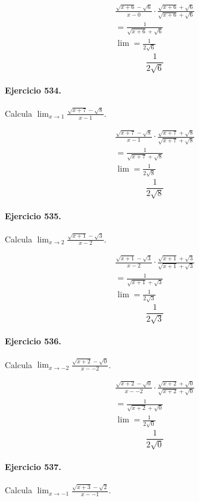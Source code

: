 \documentclass[11pt,a4paper]{article}
\begin{document}
\[
\begin{aligned}
\frac{\sqrt{x+6}-\sqrt{6}}{x-0}\cdot \frac{\sqrt{x+6}+\sqrt{6}}{\sqrt{x+6}+\sqrt{6}}\\
=\frac{1}{\sqrt{x+6}+\sqrt{6}}\\
\lim=\frac{1}{2\sqrt{6}}
\end{aligned}
\]
\[\boxed{\frac{1}{2\sqrt{6}}}\]


\paragraph{Ejercicio 534.} Calcula $\displaystyle\lim_{x\to 1}\frac{\sqrt{x+7}-\sqrt{8}}{x-1}$.

\[
\begin{aligned}
\frac{\sqrt{x+7}-\sqrt{8}}{x-1}\cdot \frac{\sqrt{x+7}+\sqrt{8}}{\sqrt{x+7}+\sqrt{8}}\\
=\frac{1}{\sqrt{x+7}+\sqrt{8}}\\
\lim=\frac{1}{2\sqrt{8}}
\end{aligned}
\]
\[\boxed{\frac{1}{2\sqrt{8}}}\]


\paragraph{Ejercicio 535.} Calcula $\displaystyle\lim_{x\to 2}\frac{\sqrt{x+1}-\sqrt{3}}{x-2}$.

\[
\begin{aligned}
\frac{\sqrt{x+1}-\sqrt{3}}{x-2}\cdot \frac{\sqrt{x+1}+\sqrt{3}}{\sqrt{x+1}+\sqrt{3}}\\
=\frac{1}{\sqrt{x+1}+\sqrt{3}}\\
\lim=\frac{1}{2\sqrt{3}}
\end{aligned}
\]
\[\boxed{\frac{1}{2\sqrt{3}}}\]


\paragraph{Ejercicio 536.} Calcula $\displaystyle\lim_{x\to -2}\frac{\sqrt{x+2}-\sqrt{0}}{x--2}$.

\[
\begin{aligned}
\frac{\sqrt{x+2}-\sqrt{0}}{x--2}\cdot \frac{\sqrt{x+2}+\sqrt{0}}{\sqrt{x+2}+\sqrt{0}}\\
=\frac{1}{\sqrt{x+2}+\sqrt{0}}\\
\lim=\frac{1}{2\sqrt{0}}
\end{aligned}
\]
\[\boxed{\frac{1}{2\sqrt{0}}}\]


\paragraph{Ejercicio 537.} Calcula $\displaystyle\lim_{x\to -1}\frac{\sqrt{x+3}-\sqrt{2}}{x--1}$.
\end{document}
